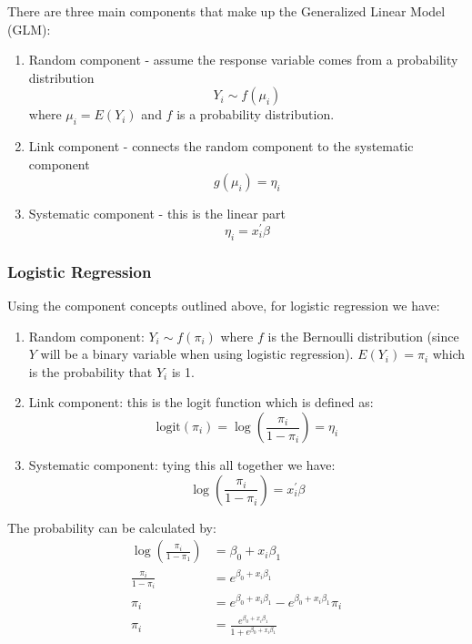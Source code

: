 
There are three main components that make up the Generalized Linear Model (GLM):

\begin{enumerate}
\item Random component - assume the response variable comes from a probability distribution
\begin{equation}
Y_i \sim f(\mu_i)
\end{equation}
where $\mu_i = E(Y_i)$ and $f$ is a probability distribution.
\item Link component - connects the random component to the systematic component
\begin{equation}
g(\mu_i)=\eta_i
\end{equation}
\item Systematic component - this is the linear part
\begin{equation}
\eta_i = x_i^\prime \beta
\end{equation}

\end{enumerate}


\subsubsection{Logistic Regression}

Using the component concepts outlined above, for logistic regression we have:

\begin{enumerate}
\item Random component: $Y_i \sim f(\pi_i)$ where $f$ is the Bernoulli distribution (since $Y$ will be a binary variable when using logistic regression). $E(Y_i) = \pi_i $ which is the probability that $Y_i$ is 1.
\item Link component: this is the logit function which is defined as:
\begin{equation}
\text{logit}(\pi_i) = \log \left(\frac{\pi_i}{1-\pi_i} \right) = \eta_i
\end{equation}
\item Systematic component: tying this all together we have:
\begin{equation}
\log \left(\frac{\pi_i}{1-\pi_i}\right) = x_i^\prime \beta
\end{equation}
\end{enumerate}

The probability can be calculated by:
\begin{equation}
\begin{split}
\log \left(\frac{\pi_i}{1-\pi_1} \right) & = \beta_0 + x_i \beta_1 \\
\frac{\pi_i}{1-\pi_i} &= e^{\beta_0 + x_i \beta_1} \\
\pi_i &= e^{\beta_0 + x_i \beta_1} - e^{\beta_0 + x_i \beta_1} \pi_i \\
\pi_i &= \frac{e^{\beta_0 + x_i \beta_1}}{1+e^{\beta_0 + x_i \beta_1}}
\end{split}
\end{equation}

